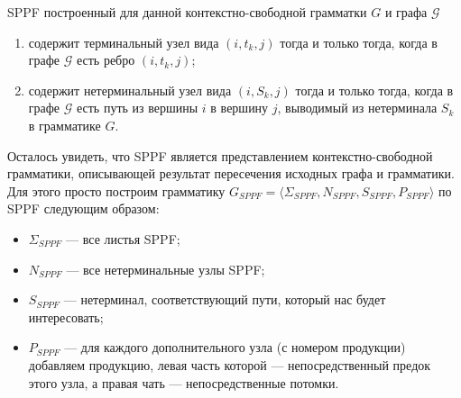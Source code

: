     \begin{note}
    SPPF построенный для данной контекстно-свободной грамматки $G$ и графа $\mathcal{G}$ 
    \begin{enumerate}
      \item содержит терминальный узел вида $(i,t_k,j)$ тогда и только тогда, когда в графе $\mathcal{G}$ есть ребро $(i,t_k,j)$;
      \item содержит нетерминальный узел вида $(i,S_k,j)$ тогда и только тогда, когда в графе $\mathcal{G}$ есть путь из вершины $i$ в вершину $j$, выводимый из нетерминала $S_k$ в грамматике $G$.
    \end{enumerate}
    \end{note}
    
    Осталось увидеть, что SPPF является представлением контекстно-свободной грамматики, описывающей результат пересечения исходных графа и грамматики. Для этого просто построим грамматику $G_{\textit{SPPF}} = \langle \Sigma_{\textit{SPPF}}, N_{\textit{SPPF}}, S_{\textit{SPPF}}, P_{\textit{SPPF}}\rangle$ по SPPF следующим образом:
    \begin{itemize}
      \item $\Sigma_{\textit{SPPF}}$ --- все листья SPPF;
      \item $N_{\textit{SPPF}}$ --- все нетерминальные узлы SPPF;
      \item $S_{\textit{SPPF}}$ --- нетерминал, соответствующий пути, который нас будет интересовать;
      \item $P_{\textit{SPPF}}$ --- для каждого дополнительного узла (с номером продукции) добавляем продукцию, левая часть которой --- непосредственный предок этого узла, а правая чать --- непосредственные потомки. 
    \end{itemize} 


